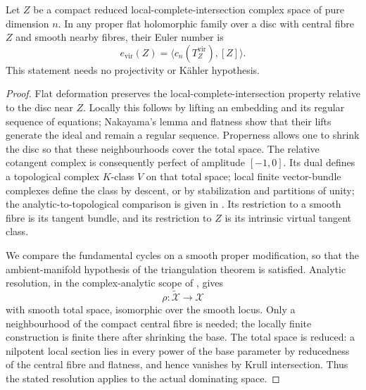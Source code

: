 \begin{lemma}\label{push:src:A.3.1}\label{push:A31}
Let $Z$ be a compact reduced local-complete-intersection complex
space of pure dimension $n$. In any proper flat holomorphic
family over a disc with central fibre $Z$ and smooth nearby
fibres, their Euler number is
\[
 e_{\mathrm{vir}}(Z)=\langle c_n(T_Z^{\mathrm{vir}}),[Z]\rangle.
\]
This statement needs no projectivity or K\"ahler hypothesis.
\end{lemma}

\begin{proof}
Flat deformation preserves the local-complete-intersection
property relative to the disc near $Z$. Locally this follows by
lifting an embedding and its regular sequence of equations;
Nakayama's lemma and flatness show that their lifts generate
the ideal and remain a regular sequence. Properness allows one
to shrink the disc so that these neighbourhoods cover the total
space. The relative cotangent complex is consequently perfect
of amplitude $[-1,0]$. Its dual defines a topological complex
$K$-class $V$ on that total space; local finite vector-bundle
complexes define the class by descent, or by stabilization and
partitions of unity; the analytic-to-topological comparison is
given in \cite[Lemmas 3.1--3.2 and Section 3.1]{Levy08}.
Its restriction to a smooth fibre is its
tangent bundle, and its restriction to $Z$ is its intrinsic
virtual tangent class.

We compare the fundamental cycles on a smooth proper modification,
so that the ambient-manifold hypothesis of the triangulation theorem
is satisfied. Analytic resolution, in the complex-analytic scope of
\cite[Section~0.2(2), p.~3; Theorem~1.6 and its noncompact extension,
p.~5; Remark~1.16, p.~11]{BM95AB}, gives
\[
 \rho:\widetilde{\mathcal X}\longrightarrow\mathcal X
\]
with smooth total space, isomorphic over the smooth locus. Only a
neighbourhood of the compact central fibre is needed; the locally
finite construction is finite there after shrinking the base.
The total space is reduced: a nilpotent local section lies in every
power of the base parameter by reducedness of the central fibre and
flatness, and hence vanishes by Krull intersection. Thus the stated
resolution applies to the actual dominating space.


\end{proof}
